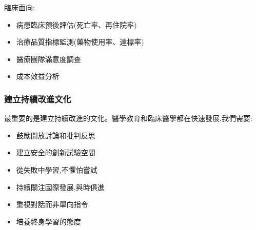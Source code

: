 \documentclass[12pt,a4paper]{article}
\begin{document}
臨床面向:
\begin{itemize}[nosep]
    \item 病患臨床預後評估(死亡率、再住院率)
    \item 治療品質指標監測(藥物使用率、達標率)
    \item 醫療團隊滿意度調查
    \item 成本效益分析
\end{itemize}

\subsubsection{建立持續改進文化}

最重要的是建立持續改進的文化。醫學教育和臨床醫學都在快速發展,我們需要:
\begin{itemize}[nosep]
    \item 鼓勵開放討論和批判反思
    \item 建立安全的創新試驗空間
    \item 從失敗中學習,不懼怕嘗試
    \item 持續關注國際發展,與時俱進
    \item 重視對話而非單向指令
    \item 培養終身學習的態度
\end{itemize}
\end{document}
